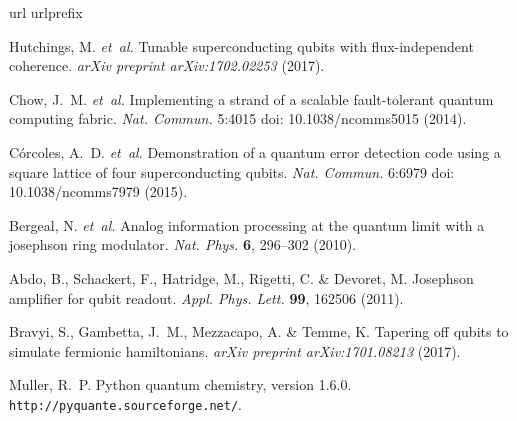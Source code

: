 \documentclass[twocolumn]{revtex4-1}
\newcommand{\1}{\mathbbm{1}}
\begin{document}
\begin{thebibliography}{10}
\expandafter\ifx\csname url\endcsname\relax
  \def\url#1{\texttt{#1}}\fi
\expandafter\ifx\csname urlprefix\endcsname\relax\def\urlprefix{URL }\fi
\providecommand{\bibinfo}[2]{#2}
\providecommand{\eprint}[2][]{\url{#2}}

\bibinfo{author}{Hutchings, M.} \emph{et~al.}
\newblock \bibinfo{title}{Tunable superconducting qubits with flux-independent
  coherence}.
\newblock \emph{\bibinfo{journal}{arXiv preprint arXiv:1702.02253}}
  (\bibinfo{year}{2017}).

\bibinfo{author}{Chow, J.~M.} \emph{et~al.}
\newblock \bibinfo{title}{Implementing a strand of a scalable fault-tolerant
  quantum computing fabric}.
\newblock \emph{\bibinfo{journal}{Nat. Commun.}} \bibinfo{pages}{5:4015 doi:
  10.1038/ncomms5015} (\bibinfo{year}{2014}).

\bibinfo{author}{C{\'o}rcoles, A.~D.} \emph{et~al.}
\newblock \bibinfo{title}{Demonstration of a quantum error detection code using
  a square lattice of four superconducting qubits}.
\newblock \emph{\bibinfo{journal}{Nat. Commun.}} \bibinfo{pages}{6:6979 doi:
  10.1038/ncomms7979} (\bibinfo{year}{2015}).

\bibinfo{author}{Bergeal, N.} \emph{et~al.}
\newblock \bibinfo{title}{Analog information processing at the quantum limit
  with a josephson ring modulator}.
\newblock \emph{\bibinfo{journal}{Nat. Phys.}}
  \textbf{\bibinfo{volume}{6}}, \bibinfo{pages}{296--302}
  (\bibinfo{year}{2010}).

\bibinfo{author}{Abdo, B.}, \bibinfo{author}{Schackert, F.},
  \bibinfo{author}{Hatridge, M.}, \bibinfo{author}{Rigetti, C.} \&
  \bibinfo{author}{Devoret, M.}
\newblock \bibinfo{title}{Josephson amplifier for qubit readout}.
\newblock \emph{\bibinfo{journal}{Appl. Phys. Lett.}}
  \textbf{\bibinfo{volume}{99}}, \bibinfo{pages}{162506}
  (\bibinfo{year}{2011}).

\bibinfo{author}{Bravyi, S.}, \bibinfo{author}{Gambetta, J.~M.},
  \bibinfo{author}{Mezzacapo, A.} \& \bibinfo{author}{Temme, K.}
\newblock \bibinfo{title}{Tapering off qubits to simulate fermionic
  hamiltonians}.
\newblock \emph{\bibinfo{journal}{arXiv preprint arXiv:1701.08213}}
  (\bibinfo{year}{2017}).

\bibinfo{author}{Muller, R.~P.}
\newblock \bibinfo{title}{Python quantum chemistry, version 1.6.0}.
\newblock \bibinfo{howpublished}{\url{http://pyquante.sourceforge.net/}}.


\end{thebibliography}
\end{document}
